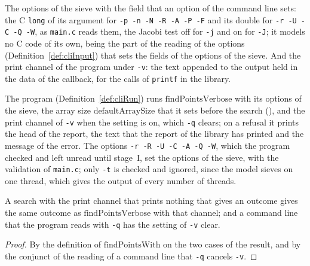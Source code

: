 \begin{definition}\label{def:cliTuning}
  \leanok
  The options of the sieve with the field that an option of the command line sets: the C \verb|long|
  of its argument for \verb|-p -n -N -R -A -P -F| and its double for \verb|-r -U -C -Q -W|, as
  \verb|main.c| reads them, the Jacobi test off for \verb|-j| and on for \verb|-J|; it models no C
  code of its own, being the part of the reading of the options (Definition~\ref{def:cliInput}) that
  sets the fields of the options of the sieve. And the print channel of the program under \verb|-v|:
  the text appended to the output held in the data of the callback, for the calls of \verb|printf|
  in the library.
\end{definition}

The program (Definition~\ref{def:cliRun}) runs $\mathrm{findPointsVerbose}$ with its options of the
sieve, the array size $\mathrm{defaultArraySize}$ that it sets before the search
(), and the print channel of \verb|-v| when the setting is on, which
\verb|-q| clears; on a refusal it prints the head of the report, the text that the report of the
library has printed and the message of the error. The options \verb|-r -R -U -C -A -Q -W|, which the
program checked and left unread until stage~I, set the options of the sieve, with the validation of
\verb|main.c|; only \verb|-t| is checked and ignored, since the model sieves on one thread, which
gives the output of every number of threads.

\begin{lemma}\label{lem:cliVerbose}
  \leanok
  A search with the print channel that prints nothing that gives an outcome gives the same outcome
  as $\mathrm{findPointsVerbose}$ with that channel; and a command line that the program reads with
  \verb|-q| has the setting of \verb|-v| clear.
\end{lemma}

\begin{proof}
  \leanok
  By the definition of $\mathrm{findPointsWith}$ on the two cases of the result, and by the conjunct
  of the reading of a command line that \verb|-q| cancels \verb|-v|.
\end{proof}

